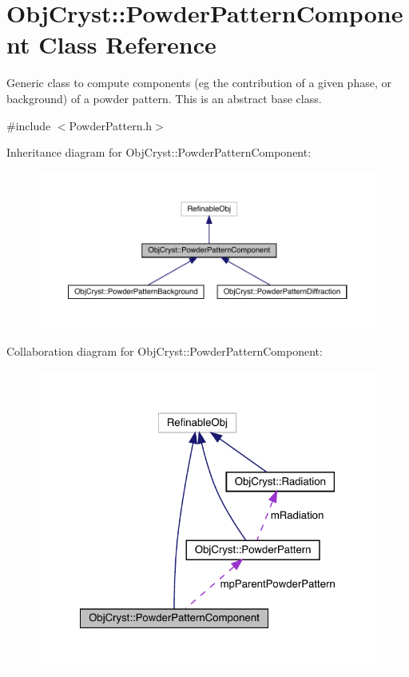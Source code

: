 \hypertarget{class_obj_cryst_1_1_powder_pattern_component}{}\section{Obj\+Cryst\+::Powder\+Pattern\+Component Class Reference}
\label{class_obj_cryst_1_1_powder_pattern_component}


Generic class to compute components (eg the contribution of a given phase, or background) of a powder pattern. This is an abstract base class.  




{\ttfamily \#include $<$Powder\+Pattern.\+h$>$}



Inheritance diagram for Obj\+Cryst\+::Powder\+Pattern\+Component\+:
\nopagebreak
\begin{figure}[H]
\begin{center}
\leavevmode
\includegraphics[width=350pt]{class_obj_cryst_1_1_powder_pattern_component__inherit__graph}
\end{center}
\end{figure}


Collaboration diagram for Obj\+Cryst\+::Powder\+Pattern\+Component\+:
\nopagebreak
\begin{figure}[H]
\begin{center}
\leavevmode
\includegraphics[width=322pt]{class_obj_cryst_1_1_powder_pattern_component__coll__graph}
\end{center}
\end{figure}
